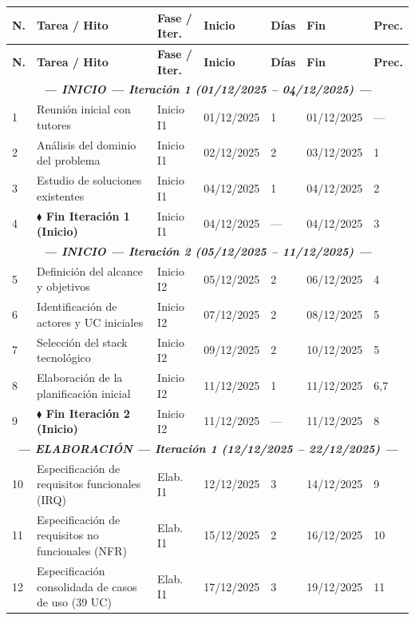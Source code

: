 \documentclass[11pt, a4paper]{article}
\begin{document}
\begin{longtable}{|p{0.6cm}|p{5.2cm}|p{2.5cm}|p{1.9cm}|p{0.9cm}|p{1.9cm}|p{1.4cm}|}
\hline
\textbf{N.} & \textbf{Tarea / Hito} & \textbf{Fase / Iter.} & \textbf{Inicio} & \textbf{Días} & \textbf{Fin} & \textbf{Prec.} \\
\hline
\endfirsthead
\hline
\textbf{N.} & \textbf{Tarea / Hito} & \textbf{Fase / Iter.} & \textbf{Inicio} & \textbf{Días} & \textbf{Fin} & \textbf{Prec.} \\
\hline
\endhead
\multicolumn{7}{|c|}{\textit{\textbf{--- INICIO --- Iteración 1 (01/12/2025 -- 04/12/2025) ---}}} \\
\hline
1 & Reunión inicial con tutores & Inicio I1 & 01/12/2025 & 1 & 01/12/2025 & --- \\
\hline
2 & Análisis del dominio del problema & Inicio I1 & 02/12/2025 & 2 & 03/12/2025 & 1 \\
\hline
3 & Estudio de soluciones existentes & Inicio I1 & 04/12/2025 & 1 & 04/12/2025 & 2 \\
\hline
4 & \textbf{$\blacklozenge$ Fin Iteración 1 (Inicio)} & Inicio I1 & 04/12/2025 & --- & 04/12/2025 & 3 \\
\hline
\multicolumn{7}{|c|}{\textit{\textbf{--- INICIO --- Iteración 2 (05/12/2025 -- 11/12/2025) ---}}} \\
\hline
5 & Definición del alcance y objetivos & Inicio I2 & 05/12/2025 & 2 & 06/12/2025 & 4 \\
\hline
6 & Identificación de actores y UC iniciales & Inicio I2 & 07/12/2025 & 2 & 08/12/2025 & 5 \\
\hline
7 & Selección del stack tecnológico & Inicio I2 & 09/12/2025 & 2 & 10/12/2025 & 5 \\
\hline
8 & Elaboración de la planificación inicial & Inicio I2 & 11/12/2025 & 1 & 11/12/2025 & 6,7 \\
\hline
9 & \textbf{$\blacklozenge$ Fin Iteración 2 (Inicio)} & Inicio I2 & 11/12/2025 & --- & 11/12/2025 & 8 \\
\hline
\multicolumn{7}{|c|}{\textit{\textbf{--- ELABORACIÓN --- Iteración 1 (12/12/2025 -- 22/12/2025) ---}}} \\
\hline
10 & Especificación de requisitos funcionales (IRQ) & Elab. I1 & 12/12/2025 & 3 & 14/12/2025 & 9 \\
\hline
11 & Especificación de requisitos no funcionales (NFR) & Elab. I1 & 15/12/2025 & 2 & 16/12/2025 & 10 \\
\hline
12 & Especificación consolidada de casos de uso (39 UC) & Elab. I1 & 17/12/2025 & 3 & 19/12/2025 & 11 \\

\end{longtable}
\end{document}

